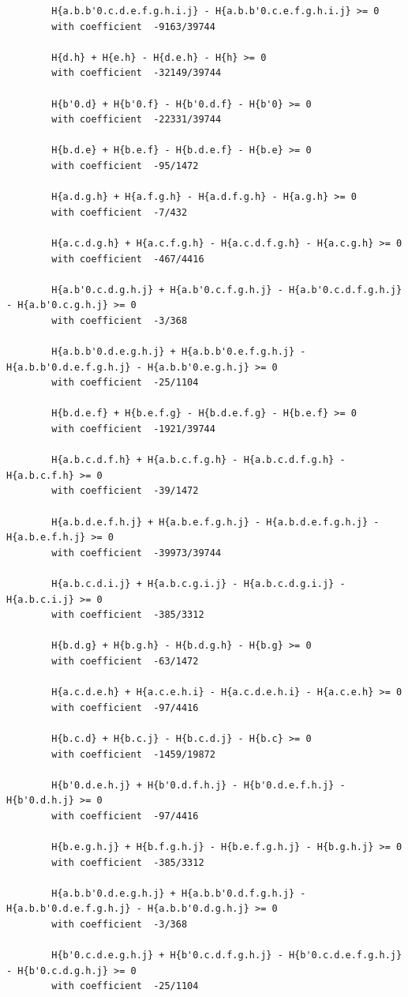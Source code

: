 \documentclass[11pt, a4paper]{kybernetika}
\begin{document}
\begin{verbatim}
		H{a.b.b'0.c.d.e.f.g.h.i.j} - H{a.b.b'0.c.e.f.g.h.i.j} >= 0
		with coefficient  -9163/39744
		
		H{d.h} + H{e.h} - H{d.e.h} - H{h} >= 0
		with coefficient  -32149/39744
		
		H{b'0.d} + H{b'0.f} - H{b'0.d.f} - H{b'0} >= 0
		with coefficient  -22331/39744
		
		H{b.d.e} + H{b.e.f} - H{b.d.e.f} - H{b.e} >= 0
		with coefficient  -95/1472
		
		H{a.d.g.h} + H{a.f.g.h} - H{a.d.f.g.h} - H{a.g.h} >= 0
		with coefficient  -7/432
		
		H{a.c.d.g.h} + H{a.c.f.g.h} - H{a.c.d.f.g.h} - H{a.c.g.h} >= 0
		with coefficient  -467/4416
		
		H{a.b'0.c.d.g.h.j} + H{a.b'0.c.f.g.h.j} - H{a.b'0.c.d.f.g.h.j} - H{a.b'0.c.g.h.j} >= 0
		with coefficient  -3/368
		
		H{a.b.b'0.d.e.g.h.j} + H{a.b.b'0.e.f.g.h.j} - H{a.b.b'0.d.e.f.g.h.j} - H{a.b.b'0.e.g.h.j} >= 0
		with coefficient  -25/1104
		
		H{b.d.e.f} + H{b.e.f.g} - H{b.d.e.f.g} - H{b.e.f} >= 0
		with coefficient  -1921/39744
		
		H{a.b.c.d.f.h} + H{a.b.c.f.g.h} - H{a.b.c.d.f.g.h} - H{a.b.c.f.h} >= 0
		with coefficient  -39/1472
		
		H{a.b.d.e.f.h.j} + H{a.b.e.f.g.h.j} - H{a.b.d.e.f.g.h.j} - H{a.b.e.f.h.j} >= 0
		with coefficient  -39973/39744
		
		H{a.b.c.d.i.j} + H{a.b.c.g.i.j} - H{a.b.c.d.g.i.j} - H{a.b.c.i.j} >= 0
		with coefficient  -385/3312
		
		H{b.d.g} + H{b.g.h} - H{b.d.g.h} - H{b.g} >= 0
		with coefficient  -63/1472
		
		H{a.c.d.e.h} + H{a.c.e.h.i} - H{a.c.d.e.h.i} - H{a.c.e.h} >= 0
		with coefficient  -97/4416
		
		H{b.c.d} + H{b.c.j} - H{b.c.d.j} - H{b.c} >= 0
		with coefficient  -1459/19872
		
		H{b'0.d.e.h.j} + H{b'0.d.f.h.j} - H{b'0.d.e.f.h.j} - H{b'0.d.h.j} >= 0
		with coefficient  -97/4416
		
		H{b.e.g.h.j} + H{b.f.g.h.j} - H{b.e.f.g.h.j} - H{b.g.h.j} >= 0
		with coefficient  -385/3312
		
		H{a.b.b'0.d.e.g.h.j} + H{a.b.b'0.d.f.g.h.j} - H{a.b.b'0.d.e.f.g.h.j} - H{a.b.b'0.d.g.h.j} >= 0
		with coefficient  -3/368
		
		H{b'0.c.d.e.g.h.j} + H{b'0.c.d.f.g.h.j} - H{b'0.c.d.e.f.g.h.j} - H{b'0.c.d.g.h.j} >= 0
		with coefficient  -25/1104
		

\end{verbatim}
\end{document}
